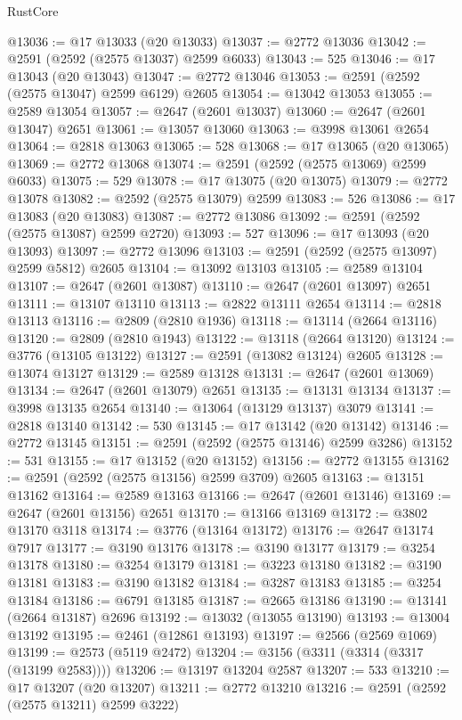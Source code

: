 \begin{lexlean}{RustCore}
\begin{coremodule}
@13036 := @17 @13033 (@20 @13033)
@13037 := @2772 @13036
@13042 := @2591 (@2592 (@2575 @13037) @2599 @6033)
@13043 := 525
@13046 := @17 @13043 (@20 @13043)
@13047 := @2772 @13046
@13053 := @2591 (@2592 (@2575 @13047) @2599 @6129) @2605
@13054 := @13042 @13053
@13055 := @2589 @13054
@13057 := @2647 (@2601 @13037)
@13060 := @2647 (@2601 @13047) @2651
@13061 := @13057 @13060
@13063 := @3998 @13061 @2654
@13064 := @2818 @13063
@13065 := 528
@13068 := @17 @13065 (@20 @13065)
@13069 := @2772 @13068
@13074 := @2591 (@2592 (@2575 @13069) @2599 @6033)
@13075 := 529
@13078 := @17 @13075 (@20 @13075)
@13079 := @2772 @13078
@13082 := @2592 (@2575 @13079) @2599
@13083 := 526
@13086 := @17 @13083 (@20 @13083)
@13087 := @2772 @13086
@13092 := @2591 (@2592 (@2575 @13087) @2599 @2720)
@13093 := 527
@13096 := @17 @13093 (@20 @13093)
@13097 := @2772 @13096
@13103 := @2591 (@2592 (@2575 @13097) @2599 @5812) @2605
@13104 := @13092 @13103
@13105 := @2589 @13104
@13107 := @2647 (@2601 @13087)
@13110 := @2647 (@2601 @13097) @2651
@13111 := @13107 @13110
@13113 := @2822 @13111 @2654
@13114 := @2818 @13113
@13116 := @2809 (@2810 @1936)
@13118 := @13114 (@2664 @13116)
@13120 := @2809 (@2810 @1943)
@13122 := @13118 (@2664 @13120)
@13124 := @3776 (@13105 @13122)
@13127 := @2591 (@13082 @13124) @2605
@13128 := @13074 @13127
@13129 := @2589 @13128
@13131 := @2647 (@2601 @13069)
@13134 := @2647 (@2601 @13079) @2651
@13135 := @13131 @13134
@13137 := @3998 @13135 @2654
@13140 := @13064 (@13129 @13137) @3079
@13141 := @2818 @13140
@13142 := 530
@13145 := @17 @13142 (@20 @13142)
@13146 := @2772 @13145
@13151 := @2591 (@2592 (@2575 @13146) @2599 @3286)
@13152 := 531
@13155 := @17 @13152 (@20 @13152)
@13156 := @2772 @13155
@13162 := @2591 (@2592 (@2575 @13156) @2599 @3709) @2605
@13163 := @13151 @13162
@13164 := @2589 @13163
@13166 := @2647 (@2601 @13146)
@13169 := @2647 (@2601 @13156) @2651
@13170 := @13166 @13169
@13172 := @3802 @13170 @3118
@13174 := @3776 (@13164 @13172)
@13176 := @2647 @13174 @7917
@13177 := @3190 @13176
@13178 := @3190 @13177
@13179 := @3254 @13178
@13180 := @3254 @13179
@13181 := @3223 @13180
@13182 := @3190 @13181
@13183 := @3190 @13182
@13184 := @3287 @13183
@13185 := @3254 @13184
@13186 := @6791 @13185
@13187 := @2665 @13186
@13190 := @13141 (@2664 @13187) @2696
@13192 := @13032 (@13055 @13190)
@13193 := @13004 @13192
@13195 := @2461 (@12861 @13193)
@13197 := @2566 (@2569 @1069)
@13199 := @2573 (@5119 @2472)
@13204 := @3156 (@3311 (@3314 (@3317 (@13199 @2583))))
@13206 := @13197 @13204 @2587
@13207 := 533
@13210 := @17 @13207 (@20 @13207)
@13211 := @2772 @13210
@13216 := @2591 (@2592 (@2575 @13211) @2599 @3222)

\end{coremodule}
\end{lexlean}
